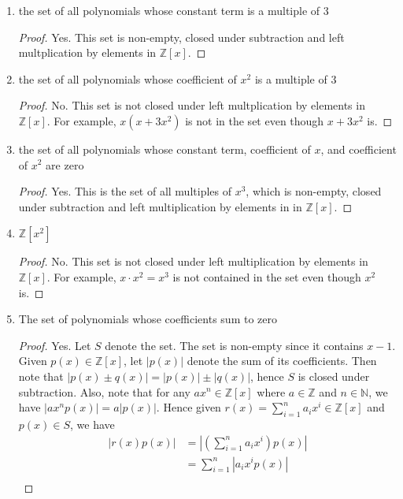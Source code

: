 \documentclass{article}
\begin{document}
\begin{enumerate}[label={\bf Q\arabic*:}]
    \begin{enumerate}
      \item the set of all polynomials whose constant term is a multiple of
        3
        \begin{proof}
          Yes. This set is non-empty, closed under subtraction and left
          multplication by elements in $\mathbb{Z}[x]$.
        \end{proof}
      \item the set of all polynomials whose coefficient of $x^2$ is a
        multiple of 3
        \begin{proof}
          No. This set is not closed under left multplication
          by elements in $\mathbb{Z}[x]$. For example, $x(x+3x^2)$ is not
          in the set even though $x+3x^2$ is.
        \end{proof}
      \item the set of all polynomials whose constant term, coefficient of
        $x$, and coefficient of $x^2$ are zero
        \begin{proof}
          Yes. This is the set of all multiples of $x^3$, which is
          non-empty, closed under subtraction and left multiplication by
          elements in in $\mathbb{Z}[x]$.
        \end{proof}
      \item $\mathbb{Z}[x^2]$
        \begin{proof}
          No. This set is not closed under left multiplication by elements
          in $\mathbb{Z}[x]$. For example, $x\cdot x^2=x^3$ is not
          contained in the set even though $x^2$ is.
        \end{proof}
      \item The set of polynomials whose coefficients sum to zero
        \begin{proof}
          Yes. Let $S$ denote the set. The set is non-empty since it
          contains $x-1$. Given $p(x)\in\mathbb{Z}[x]$,
          let $|p(x)|$ denote the sum of its coefficients. Then note that
          $|p(x)\pm q(x)|=|p(x)|\pm|q(x)|$, hence $S$ is closed under
          subtraction. Also, note that for any $ax^n\in\mathbb{Z}[x]$ where
          $a\in\mathbb{Z}$ and $n\in\mathbb{N}$, we have
          $|ax^np(x)|=a|p(x)|$. Hence given
          $r(x)=\sum_{i=1}^na_ix^i\in\mathbb{Z}[x]$ and $p(x)\in S$, we
          have
          \begin{align*}
            |r(x)p(x)|  &= |(\sum_{i=1}^na_ix^i)p(x)| \\
                        &= \sum_{i=1}^n|a_ix^ip(x)| \\

\end{align*}
\end{proof}
\end{enumerate}
\end{enumerate}
\end{document}
